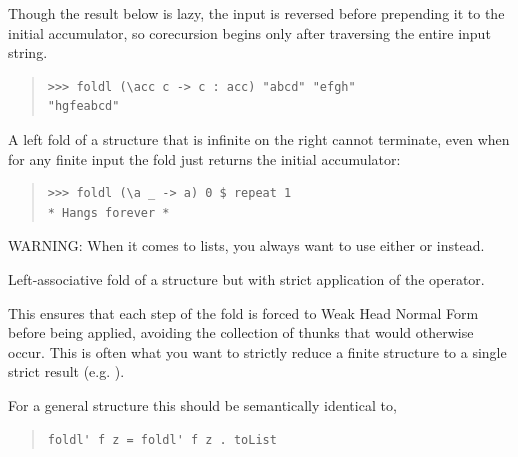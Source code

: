\begin{haddockdesc}
{\begin{quote}
{\begin{verbatim}
\end{verbatim}}
\end{quote}
Though the result below is lazy, the input is reversed before prepending
 it to the initial accumulator, so corecursion begins only after traversing
 the entire input string.\par
\begin{quote}
{\haddockverb\begin{verbatim}
>>> foldl (\acc c -> c : acc) "abcd" "efgh"
"hgfeabcd"

\end{verbatim}}
\end{quote}
A left fold of a structure that is infinite on the right cannot
 terminate, even when for any finite input the fold just returns the
 initial accumulator:\par
\begin{quote}
{\haddockverb\begin{verbatim}
>>> foldl (\a _ -> a) 0 $ repeat 1
* Hangs forever *

\end{verbatim}}
\end{quote}
WARNING: When it comes to lists, you always want to use either  or  instead.\par}
\end{haddockdesc}
\begin{haddockdesc}
\item[\begin{tabular}{@{}l}
foldl' :: Foldable t => (b -> a -> b) -> b -> t a -> b
\end{tabular}]
{\haddockbegindoc
Left-associative fold of a structure but with strict application of
 the operator.\par
This ensures that each step of the fold is forced to Weak Head Normal
 Form before being applied, avoiding the collection of thunks that would
 otherwise occur.  This is often what you want to strictly reduce a
 finite structure to a single strict result (e.g. ).\par
For a general  structure this should be semantically identical
 to,\par
\begin{quote}
{\haddockverb\begin{verbatim}
foldl' f z = foldl' f z . toList\end{verbatim}}
\end{quote}}
\end{haddockdesc}
